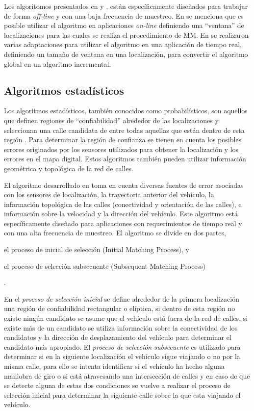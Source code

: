 Los algoritomos presentados en \cite{lou2009map} y \cite{yuan2010interactive}, están específicamente diseñados para trabajar de forma \emph{off-line} y con una baja frecuencia de muestreo. En \cite{lou2009map} se  menciona que es posible utilizar el algoritmo en aplicaciones \emph{on-line} definiendo una “ventana” de localizaciones para las cuales se realiza el procedimiento de MM. En \cite{sakic2012map} se realizaron varias adaptaciones para utilizar el algoritmo en una aplicación de tiempo real, definiendo un tamaño de ventana en una localización, para convertir el algoritmo global en un algoritmo incremental.

\subsection{Algoritmos estadísticos}

Los algoritmos estadísticos, también conocidos como probabilísticos, son aquellos que definen regiones de “confiabilidad” alrededor de las localizaciones y seleccionan una calle candidata de entre todas aquellas que están dentro de esta región \cite{quddus2007current}. Para determinar la región de confianza se tienen en cuenta los posibles errores originados por los sensores utilizados para obtener la localización y los errores en el mapa digital. Estos algoritmos también pueden utilizar información geométrica y topológica de la red de calles.

El algoritmo desarrollado en \cite{ochieng2009map} toma en cuenta diversas fuentes de error asociadas con los sensores de localización, la trayectoria anterior del vehículo, la información topológica de las calles (conectividad y orientación de las calles), e información sobre la velocidad y la dirección del vehículo. Este algoritmo está específicamente diseñado para aplicaciones con requerimientos de tiempo real y con una alta frecuencia de muestreo. El algoritmo se divide en dos partes, \begin{enumerate*}[a)]
\item el proceso de inicial de selección (Initial Matching Process), y \item el proceso de selección subsecuente (Subsequent Matching Process)\end{enumerate*}. 

En el \emph{proceso de selección inicial} se define alrededor de la primera localización una región de confiabilidad rectangular o elíptica, si dentro de esta región no existe ningún candidato se asume que el vehículo está fuera de la red de calles, si existe más de un candidato se utiliza información sobre la conectividad de los candidatos y la dirección de desplazamiento del vehículo para determinar el candidato más apropiado. El \emph{proceso de selección  subsecuente} es utilizado para determinar si en la siguiente localización el vehículo sigue viajando o no por la misma calle, para ello se intenta identificar si el vehículo ha hecho alguna maniobra de giro o si está atravesando una intersección de calles y en caso de que se detecte alguna de estas dos condiciones se vuelve a realizar el proceso de selección inicial para determinar la siguiente calle sobre la que esta viajando el vehículo.

